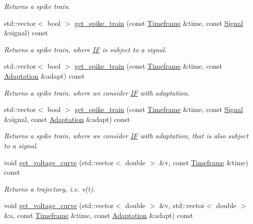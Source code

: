 \begin{DoxyCompactItemize}
\begin{DoxyCompactList}\small\item\em Returns a spike train. \end{DoxyCompactList}\item 
std\+::vector$<$ bool $>$ \hyperlink{classIF_a36ae9ec5273d532febc1ceef8d9896f0}{get\+\_\+spike\+\_\+train} (const \hyperlink{classTimeframe}{Timeframe} \&time, const \hyperlink{classSignal}{Signal} \&signal) const
\begin{DoxyCompactList}\small\item\em Returns a spike train, where \hyperlink{classIF}{IF} is subject to a signal. \end{DoxyCompactList}\item 
std\+::vector$<$ bool $>$ \hyperlink{classIF_a310fbd5d2bb172d8ac465d3e7398e5dc}{get\+\_\+spike\+\_\+train} (const \hyperlink{classTimeframe}{Timeframe} \&time, const \hyperlink{classAdaptation}{Adaptation} \&adapt) const
\begin{DoxyCompactList}\small\item\em Returns a spike train, where we consider \hyperlink{classIF}{IF} with adaptation. \end{DoxyCompactList}\item 
std\+::vector$<$ bool $>$ \hyperlink{classIF_aa8f7c58d753b9105cfd0def09ea90ab9}{get\+\_\+spike\+\_\+train} (const \hyperlink{classTimeframe}{Timeframe} \&time, const \hyperlink{classSignal}{Signal} \&signal, const \hyperlink{classAdaptation}{Adaptation} \&adapt) const
\begin{DoxyCompactList}\small\item\em Returns a spike train, where we consider \hyperlink{classIF}{IF} with adaptation, that is also subject to a signal. \end{DoxyCompactList}\item 
void \hyperlink{classIF_a22b6635d047b44a9db2a7dac0ca27e79}{get\+\_\+voltage\+\_\+curve} (std\+::vector$<$ double $>$ \&v, const \hyperlink{classTimeframe}{Timeframe} \&time) const
\begin{DoxyCompactList}\small\item\em Returns a trajectory, i.\+e. v(t). \end{DoxyCompactList}\item 
void \hyperlink{classIF_a6121cf38142658738b48bc33874082cd}{get\+\_\+voltage\+\_\+curve} (std\+::vector$<$ double $>$ \&v, std\+::vector$<$ double $>$ \&a, const \hyperlink{classTimeframe}{Timeframe} \&time, const \hyperlink{classAdaptation}{Adaptation} \&adapt) const

\end{DoxyCompactItemize}
